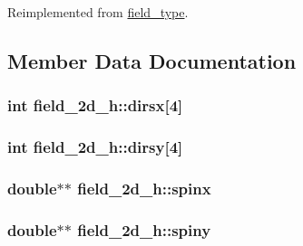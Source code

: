 Reimplemented from \hyperlink{classfield__type_afaabc410e2ce254c23e3c4aa39d1916d}{field\+\_\+type}.



\subsection{Member Data Documentation}
\subsubsection[{\texorpdfstring{dirsx}{dirsx}}]{\setlength{\rightskip}{0pt plus 5cm}int field\+\_\+2d\+\_\+h\+::dirsx\mbox{[}4\mbox{]}\hspace{0.3cm}{\ttfamily [protected]}}\hypertarget{classfield__2d__h_ab20f326cbd41670086b78939dc21f370}{}\label{classfield__2d__h_ab20f326cbd41670086b78939dc21f370}
\subsubsection[{\texorpdfstring{dirsy}{dirsy}}]{\setlength{\rightskip}{0pt plus 5cm}int field\+\_\+2d\+\_\+h\+::dirsy\mbox{[}4\mbox{]}\hspace{0.3cm}{\ttfamily [protected]}}\hypertarget{classfield__2d__h_a8a316de6115eaba1dbde1f8f6a47fd2b}{}\label{classfield__2d__h_a8a316de6115eaba1dbde1f8f6a47fd2b}
\subsubsection[{\texorpdfstring{spinx}{spinx}}]{\setlength{\rightskip}{0pt plus 5cm}double$\ast$$\ast$ field\+\_\+2d\+\_\+h\+::spinx\hspace{0.3cm}{\ttfamily [protected]}}\hypertarget{classfield__2d__h_aa2763f7d369420b8baca0d34c885deab}{}\label{classfield__2d__h_aa2763f7d369420b8baca0d34c885deab}
\subsubsection[{\texorpdfstring{spiny}{spiny}}]{\setlength{\rightskip}{0pt plus 5cm}double$\ast$$\ast$ field\+\_\+2d\+\_\+h\+::spiny\hspace{0.3cm}{\ttfamily [protected]}}\hypertarget{classfield__2d__h_a13c1fcf346bb1fac2ae507b494864bfb}{}\label{classfield__2d__h_a13c1fcf346bb1fac2ae507b494864bfb}
